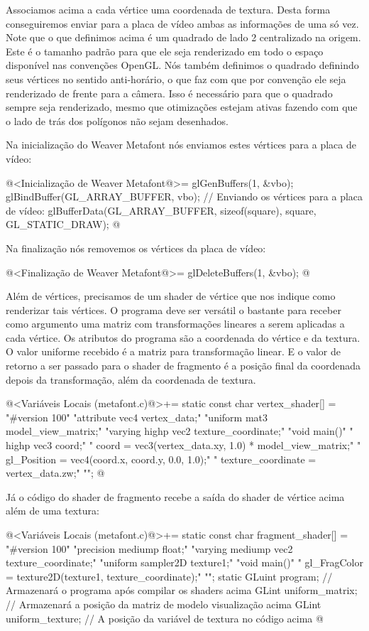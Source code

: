 {Associamos acima a cada vértice uma coordenada de textura. Desta forma
conseguiremos enviar para a placa de vídeo ambas as informações de uma
só vez. Note que o que definimos acima é um quadrado de lado 2
centralizado na origem. Este é o tamanho padrão para que ele seja
renderizado em todo o espaço disponível nas convenções OpenGL. Nós
também definimos o quadrado definindo seus vértices no sentido
anti-horário, o que faz com que por convenção ele seja renderizado de
frente para a câmera. Isso é necessário para que o quadrado sempre
seja renderizado, mesmo que otimizações estejam ativas fazendo com que
o lado de trás dos polígonos não sejam desenhados.

Na inicialização do Weaver Metafont nós enviamos estes vértices para
a placa de vídeo:

\iniciocodigo
@<Inicialização de Weaver Metafont@>=
glGenBuffers(1, &vbo);
glBindBuffer(GL_ARRAY_BUFFER, vbo);
// Enviando os vértices para a placa de vídeo:
glBufferData(GL_ARRAY_BUFFER, sizeof(square), square, GL_STATIC_DRAW);
@
\fimcodigo

Na finalização nós removemos os vértices da placa de vídeo:

\iniciocodigo
@<Finalização de Weaver Metafont@>=
glDeleteBuffers(1, &vbo);
@
\fimcodigo

Além de vértices, precisamos de um shader de vértice que nos indique
como renderizar tais vértices. O programa deve ser versátil o bastante
para receber como argumento uma matriz com transformações lineares a
serem aplicadas a cada vértice. Os atributos do programa são a
coordenada do vértice e da textura. O valor uniforme recebido é a
matriz para transformação linear. E o valor de retorno a ser passado para o shader de
fragmento é a posição final da coordenada depois da transformação,
além da coordenada de textura. 

\iniciocodigo
@<Variáveis Locais (metafont.c)@>+=
static const char vertex_shader[] =
  "#version 100\n"
  "attribute vec4 vertex_data;\n"
  "uniform mat3 model_view_matrix;\n"
  "varying highp vec2 texture_coordinate;\n"
  "void main(){\n"
  "  highp vec3 coord;\n"
  "  coord = vec3(vertex_data.xy, 1.0) * model_view_matrix;\n"
  "  gl_Position = vec4(coord.x, coord.y, 0.0, 1.0);\n"
  "  texture_coordinate = vertex_data.zw;\n"
  "}\n";
@
\fimcodigo

Já o código do shader de fragmento recebe a saída do shader de vértice
acima além de uma textura:

\iniciocodigo
@<Variáveis Locais (metafont.c)@>+=
static const char fragment_shader[] =
  "#version 100\n"
  "precision mediump float;\n"
  "varying mediump vec2 texture_coordinate;\n"
  "uniform sampler2D texture1;\n"
  "void main(){\n"
  "  gl_FragColor = texture2D(texture1, texture_coordinate);"
  "}\n";
static GLuint program; // Armazenará o programa após compilar os shaders acima
GLint uniform_matrix; // Armazenará a posição da matriz de modelo visualização acima
GLint uniform_texture; // A posição da variável de textura no código acima
@
\fimcodigo

}
